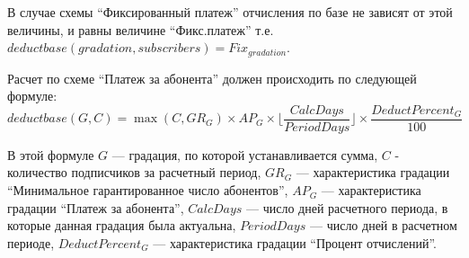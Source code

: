 В случае схемы ``Фиксированный платеж'' отчисления по базе не зависят от этой величины, и равны величине ``Фикс.платеж'' т.е. 
$ deductbase(gradation, subscribers) = Fix_{gradation} $.

Расчет по схеме ``Платеж за абонента'' должен происходить по следующей формуле:
$$ deductbase(G, C) =  \max(C, GR_{G}) \times AP_{G} \times \lfloor \frac{CalcDays}{PeriodDays} \rfloor \times \frac{DeductPercent_{G}}{100}$$

В этой формуле $G$ --- градация, по которой устанавливается сумма, $C$ - количество подписчиков за расчетный период,
$GR_{G}$ --- характеристика градации ``Минимальное гарантированное число абонентов'',
$AP_{G}$ --- характеристика градации ``Платеж за абонента'',
$CalcDays$ --- число дней расчетного периода, в которые данная градация была актуальна,
$PeriodDays$ --- число дней в расчетном периоде,
$DeductPercent_{G}$ --- характеристика градации ``Процент отчислений''.

